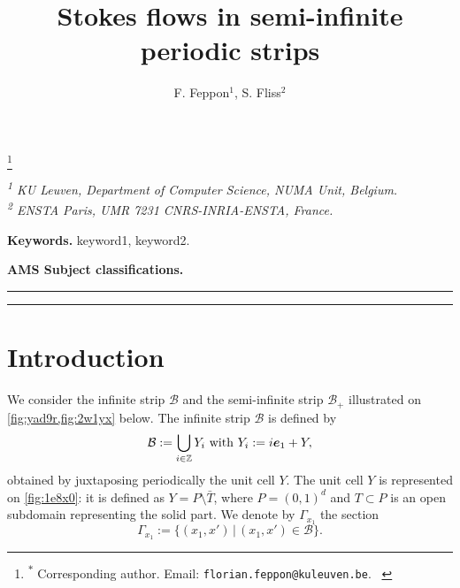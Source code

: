 \documentclass[a4paper,10pt,reqno]{amsart}
\begin{document}
\title{ Stokes flows in semi-infinite periodic strips }
\author{F. Feppon$^{1}$, S. Fliss$^{2}$}
\thanks{\hspace*{0.3em}\textsuperscript{$*$} Corresponding author. Email:
\texttt{florian.feppon@kuleuven.be}. \
\hspace*{\parindent}
}

\maketitle


\vspace{-2em}
\begin{center}
\emph{\textsuperscript{1} KU Leuven, Department of Computer Science, NUMA Unit,
    Belgium.}\\
    \emph{\textsuperscript{2} ENSTA Paris, UMR 7231 CNRS-INRIA-ENSTA,
    France.}
\end{center}

\begin{abstract} 
\end{abstract} 
\medskip  
\noindent \textbf{Keywords.} keyword1, keyword2. 

\medskip
\noindent \textbf{AMS Subject classifications.}  \par
\medskip
\bigskip
\hrule
\tableofcontents
\vspace{-0.5cm}
\hrule
\medskip
\bigskip
\section{Introduction}
    
We consider the infinite strip $\mathcal{B}$ and the semi-infinite strip $\mathcal{B}_+$ illustrated    
on \cref{fig:yad9r,fig:2w1yx} below.
The infinite strip $\mathcal{B}$ is defined by
\[
\mathcal{B}:= \bigcup_{i\in\mathbb{Z}} Y_i \text{ with }Y_i:=i{\bm e}_1 + Y,
\]     
 obtained by juxtaposing periodically
the unit cell $Y$.     
The unit cell $Y$ is represented on \cref{fig:1e8x0}:    
it is defined as $Y=P\setminus \bar T$, where $P=(0,1)^{d}$     
and $T\subset P$ is an open subdomain representing     
the solid part.  We denote by   
$\Gamma_{x_1}$ the section  
\[
    \Gamma_{x_1}:=\{ (x_1,x')\,|\, (x_1,x')\in \mathcal{B} \}.
\] 
\end{document}
